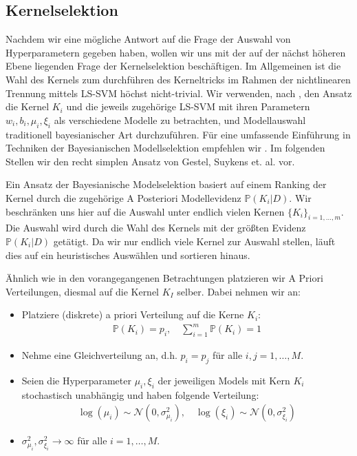 

\subsection{Kernelselektion}

Nachdem wir eine mögliche Antwort auf die Frage der Auswahl von Hyperparametern gegeben haben, wollen wir uns mit der auf der nächst höheren Ebene liegenden Frage der Kernelselektion beschäftigen. Im Allgemeinen ist die Wahl des Kernels zum durchführen des Kerneltricks im Rahmen der nichtlinearen Trennung mittels LS-SVM höchst nicht-trivial. Wir verwenden, nach \cite{LS-SVM}, den Ansatz die Kernel $K_i$ und die jeweils zugehörige LS-SVM mit ihren Parametern $w_i, b_i, \mu_i, \xi_i$ als verschiedene Modelle zu betrachten, und Modellauswahl traditionell bayesianischer Art durchzuführen. Für eine umfassende Einführung in Techniken der Bayesianischen Modellselektion empfehlen wir \cite{Bayes_model_selection}. Im folgenden Stellen wir den recht simplen Ansatz von Gestel, Suykens et. al. vor.

Ein Ansatz der Bayesianische Modelselektion basiert auf einem Ranking der Kernel durch die zugehörige A Posteriori Modellevidenz $\mathbb{P}(K_i\vert D)$. Wir beschränken uns hier auf die Auswahl unter endlich vielen Kernen $\{K_i\}_{i=1,...,m}$. Die Auswahl wird durch die Wahl des Kernels mit der größten Evidenz $\mathbb{P}(K_i\vert D)$ getätigt. Da wir nur endlich viele Kernel zur Auswahl stellen, läuft dies auf ein heuristisches Auswählen und sortieren hinaus.

Ähnlich wie in den vorangegangenen Betrachtungen platzieren wir A Priori Verteilungen, diesmal auf die Kernel $K_I$ selber. Dabei nehmen wir an:

\begin{itemize}
	\item Platziere (diskrete) a priori Verteilung auf die Kerne $K_i$:
		\begin{align*}
		\mathbb{P}(K_i) = p_i,\quad \sum_{i=1}^{m} \mathbb{P}(K_i) = 1
		\end{align*}
	\item Nehme eine Gleichverteilung an, d.h. $p_i = p_j$ für alle $i,j = 1,\dots,M$.
	\item Seien die Hyperparameter $\mu_i, \xi_i$ der jeweiligen Models mit Kern $K_i$ 				  stochastisch unabhängig und haben folgende Verteilung:
		  \begin{align*}
				\log(\mu_i) \sim \mathcal{N}(0, \sigma_{\mu_i}^2), \quad\log(\xi_i) \sim 						\mathcal{N}(0, \sigma_{\xi_i}^2)
		  \end{align*}
	\item $\sigma_{\mu_i}^2, \sigma_{\xi_i}^2 \rightarrow \infty$ für alle $i = 1,\dots,M				   $.
\end{itemize}

